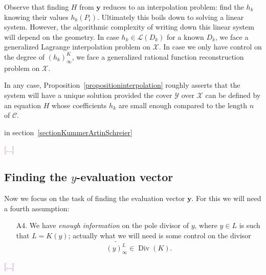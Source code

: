 \documentclass[10pt]{article}
\theoremstyle{definition}
\theoremstyle{definition}
\theoremstyle{definition}
\newcommand{\X}{\mathcal{X}}
\newcommand{\Y}{\mathcal{Y}}
\newcommand{\Div}{\operatorname{Div}}
\begin{document}
Observe that finding $H$ from $\mathbf{y}$ reduces to an interpolation problem:
find the $h_k$ knowing their values $h_k(P_i)$.
Ultimately this boils down to solving a linear system.
However, the algorithmic complexity of writing down this linear system will depend on the geometry.
In case $h_k\in\mathcal{L}(D_k)$ for a known $D_k$, we face a generalized Lagrange interpolation problem on $\X$.
In case we only have control on the degree of $(h_k)_\infty^K$, we face a generalized rational function reconstruction problem on $\X$.

In any case, Proposition~\ref{propositioninterpolation} roughly asserts that the system will have a unique solution provided the cover $\Y$ over $\X$ can be defined by an equation $H$ whose coefficients $h_k$ are small enough compared to the length $n$ of $\mathcal{C}$.

in section~\ref{sectionKummerArtinSchreier}

\textcolor{magenta}{[...]}


\subsection{Finding the $y$-evaluation vector} \label{section:4.2}

Now we focus on the task of finding the evaluation vector $\mathbf{y}$.
For this we will need a fourth assumption:

\begin{itemize}
\item[A4.] We have \emph{enough information} on the pole divisor of $y$, where $y \in L$ is such that $L=K(y)$; actually what we will need is some control on the divisor 
\[\widetilde{(y)^L_{\infty}} \in \Div(K).\] 
\end{itemize}

\textcolor{magenta}{[...]}
\end{document}
